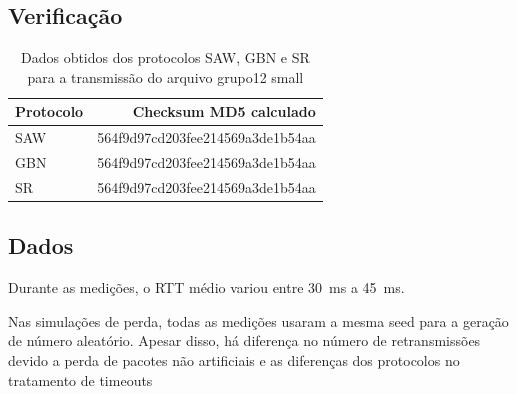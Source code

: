 \documentclass[11pt,a4paper]{article}
\begin{document}
\subsection{Verificação}
\begin{table}[H]
\begin{center}
\begin{tabular}{@{}lr@{}}
\toprule
	\textbf{Protocolo} & \textbf{Checksum MD5 calculado} \\
\midrule
	SAW & 564f9d97cd203fee214569a3de1b54aa \\
	GBN & 564f9d97cd203fee214569a3de1b54aa \\
	SR  & 564f9d97cd203fee214569a3de1b54aa \\
\bottomrule
\end{tabular}
\end{center}
\caption{Dados obtidos dos protocolos SAW, GBN e SR para a transmissão do arquivo grupo12 small}
	\label{tab:throughput}
\end{table}

\subsection{Dados}

Durante as medições, o RTT médio variou entre \SI{30}{\milli\second} a \SI{45}{\milli\second}.

Nas simulações de perda, todas as medições usaram a mesma seed para a geração de número aleatório. Apesar disso, há diferença no número de retransmissões
devido a perda de pacotes não artificiais e as diferenças dos protocolos no tratamento de timeouts
\end{document}
